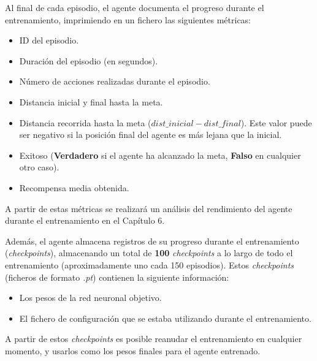 Al final de cada episodio, el agente documenta el progreso durante el entrenamiento, imprimiendo en un fichero las siguientes métricas:
\begin{itemize}
	\item ID del episodio.
	\item Duración del episodio (en segundos).
	\item Número de acciones realizadas durante el episodio.
	\item Distancia inicial y final hasta la meta.
	\item Distancia recorrida hasta la meta ($dist\_inicial - dist\_final$). Este valor puede ser negativo si la posición final del agente es más lejana que la inicial.
	\item Exitoso (\textbf{Verdadero} si el agente ha alcanzado la meta, \textbf{Falso} en cualquier otro caso).
	\item Recompensa media obtenida.
\end{itemize}

A partir de estas métricas se realizará un análisis del rendimiento del agente durante el entrenamiento en el Capítulo 6.

Además, el agente almacena registros de su progreso durante el entrenamiento (\textit{checkpoints}), almacenando un total de \textbf{100} \textit{checkpoints} a lo largo de todo el entrenamiento (aproximadamente uno cada 150 episodios). Estos \textit{checkpoints} (ficheros de formato \textit{.pt}) contienen la siguiente información:
\begin{itemize}
	\item Los pesos de la red neuronal objetivo.
	\item El fichero de configuración que se estaba utilizando durante el entrenamiento.
\end{itemize}

A partir de estos \textit{checkpoints} es posible reanudar el entrenamiento en cualquier momento, y usarlos como los pesos finales para el agente entrenado.